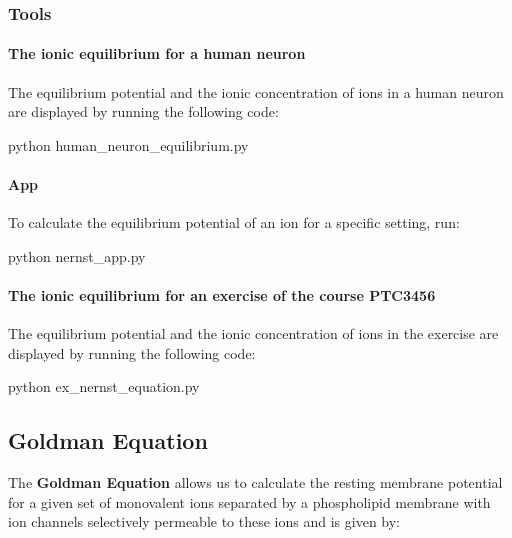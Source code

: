 \subsubsection*{Tools}

\paragraph*{The ionic equilibrium for a human neuron}

The equilibrium potential and the ionic concentration of ions in a human neuron are displayed by running the following code\+:


\begin{DoxyCode}
python human\_neuron\_equilibrium.py
\end{DoxyCode}


\paragraph*{App}

To calculate the equilibrium potential of an ion for a specific setting, run\+:


\begin{DoxyCode}
python nernst\_app.py
\end{DoxyCode}


\paragraph*{The ionic equilibrium for an exercise of the course P\+T\+C3456}

The equilibrium potential and the ionic concentration of ions in the exercise are displayed by running the following code\+:


\begin{DoxyCode}
python ex\_nernst\_equation.py
\end{DoxyCode}


\subsection*{Goldman Equation}

The {\bfseries Goldman Equation} allows us to calculate the resting membrane potential for a given set of monovalent ions separated by a phospholipid membrane with ion channels selectively permeable to these ions and is given by\+:




